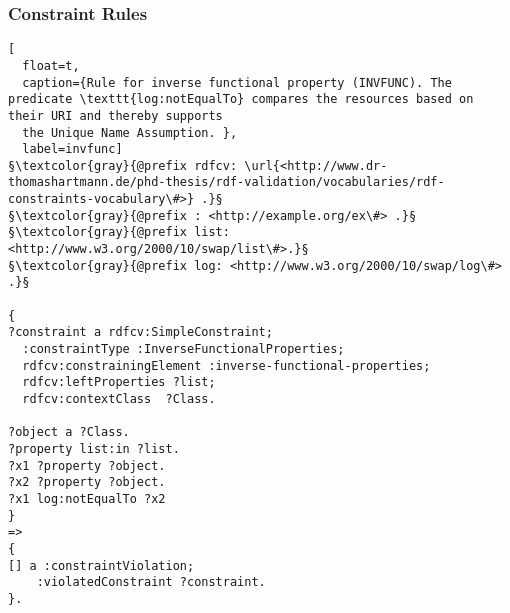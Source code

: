 \subsubsection{Constraint Rules}\label{rules}
\begin{lstlisting}[
  float=t,
  caption={Rule for inverse functional property (INVFUNC). The predicate \texttt{log:notEqualTo} compares the resources based on their URI and thereby supports 
  the Unique Name Assumption. },
  label=invfunc]
§\textcolor{gray}{@prefix rdfcv: \url{<http://www.dr-thomashartmann.de/phd-thesis/rdf-validation/vocabularies/rdf-constraints-vocabulary\#>} .}§
§\textcolor{gray}{@prefix : <http://example.org/ex\#> .}§
§\textcolor{gray}{@prefix list: <http://www.w3.org/2000/10/swap/list\#>.}§
§\textcolor{gray}{@prefix log: <http://www.w3.org/2000/10/swap/log\#> .}§

{
?constraint a rdfcv:SimpleConstraint;
  :constraintType :InverseFunctionalProperties;
  rdfcv:constrainingElement :inverse-functional-properties;
  rdfcv:leftProperties ?list;
  rdfcv:contextClass  ?Class.
  
?object a ?Class.
?property list:in ?list.
?x1 ?property ?object.
?x2 ?property ?object.
?x1 log:notEqualTo ?x2
}
=>
{
[] a :constraintViolation;
    :violatedConstraint ?constraint.
}.
\end{lstlisting}


